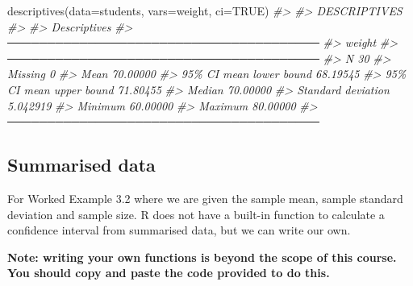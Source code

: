 \documentclass[
]{memoir}
\newenvironment{Shaded}{\begin{snugshade}}{\end{snugshade}}
\newcommand{\AttributeTok}[1]{\textcolor[rgb]{0.77,0.63,0.00}{#1}}
\newcommand{\CommentTok}[1]{\textcolor[rgb]{0.56,0.35,0.01}{\textit{#1}}}
\newcommand{\ConstantTok}[1]{\textcolor[rgb]{0.00,0.00,0.00}{#1}}
\newcommand{\FunctionTok}[1]{\textcolor[rgb]{0.00,0.00,0.00}{#1}}
\newcommand{\NormalTok}[1]{#1}
\begin{document}
\begin{Shaded}
\begin{Highlighting}[]
\FunctionTok{descriptives}\NormalTok{(}\AttributeTok{data=}\NormalTok{students, }\AttributeTok{vars=}\NormalTok{weight, }\AttributeTok{ci=}\ConstantTok{TRUE}\NormalTok{)}
\CommentTok{\#\textgreater{} }
\CommentTok{\#\textgreater{}  DESCRIPTIVES}
\CommentTok{\#\textgreater{} }
\CommentTok{\#\textgreater{}  Descriptives                            }
\CommentTok{\#\textgreater{}  ─────────────────────────────────────── }
\CommentTok{\#\textgreater{}                               weight     }
\CommentTok{\#\textgreater{}  ─────────────────────────────────────── }
\CommentTok{\#\textgreater{}    N                                30   }
\CommentTok{\#\textgreater{}    Missing                           0   }
\CommentTok{\#\textgreater{}    Mean                       70.00000   }
\CommentTok{\#\textgreater{}    95\% CI mean lower bound    68.19545   }
\CommentTok{\#\textgreater{}    95\% CI mean upper bound    71.80455   }
\CommentTok{\#\textgreater{}    Median                     70.00000   }
\CommentTok{\#\textgreater{}    Standard deviation         5.042919   }
\CommentTok{\#\textgreater{}    Minimum                    60.00000   }
\CommentTok{\#\textgreater{}    Maximum                    80.00000   }
\CommentTok{\#\textgreater{}  ───────────────────────────────────────}
\end{Highlighting}
\end{Shaded}

\hypertarget{summarised-data}{%
\subsection{Summarised data}\label{summarised-data}}

For Worked Example 3.2 where we are given the sample mean, sample standard deviation and sample size. R does not have a built-in function to calculate a confidence interval from summarised data, but we can write our own.

\textbf{Note: writing your own functions is beyond the scope of this course. You should copy and paste the code provided to do this.}
\end{document}

